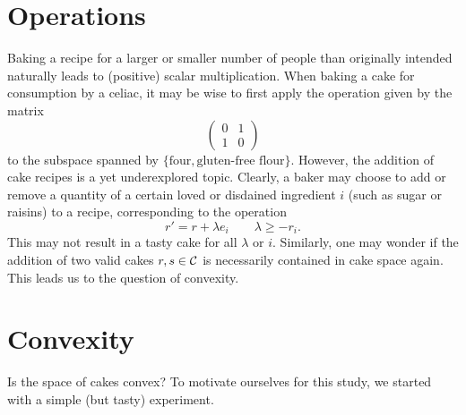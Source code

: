 \documentclass[final,3p,12pt]{elsarticle}
\begin{document}
\section{Operations}
Baking a recipe for a larger or smaller number of people than originally intended naturally leads to (positive) scalar multiplication.
When baking a cake for consumption by a celiac, it may be wise to first apply the operation given by the matrix
\begin{equation*}
	\begin{pmatrix}
		0 & 1 \\ 1 & 0
	\end{pmatrix}
\end{equation*}
to the subspace spanned by $\{\text{four}, \text{gluten-free flour}\}$.
However, the addition of cake recipes is a yet underexplored topic. 
Clearly, a baker may choose to add or remove a quantity of a certain loved or disdained ingredient $i$ (such as sugar or raisins) to a recipe, corresponding to the operation
\begin{equation*}
	r' = r + \lambda e_{i} \qquad \lambda \geq - r_i\text{.}
\end{equation*}
This may not result in a tasty cake for all $\lambda$ or $i$.
Similarly, one may wonder if the addition of two valid cakes $r,s \in \mathcal{C}$ is necessarily contained in cake space again.
This leads us to the question of convexity.


\section{Convexity}
Is the space of cakes convex? To motivate ourselves for this study, we started with a simple (but tasty) experiment.


\begin{minipage}[t]{0.45\textwidth}
\footnotesize
 
\end{minipage}%
\hfill \begin{minipage}[t]{0.45\textwidth}
\footnotesize
 
\end{minipage}

% 
\end{document}
